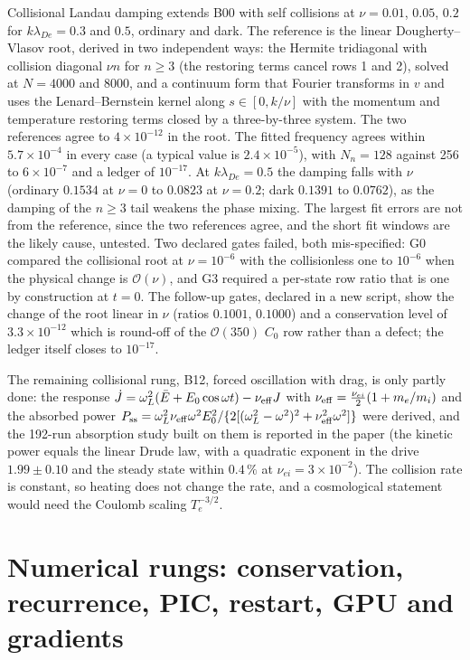 Collisional Landau damping extends B00 with self collisions at $\nu=0.01$, $0.05$, $0.2$ for $k\lambda_{De}=0.3$ and $0.5$, ordinary and dark. The reference is the linear Dougherty--Vlasov root, derived in two independent ways: the Hermite tridiagonal with collision diagonal $\nu n$ for $n\ge3$ (the restoring terms cancel rows 1 and 2), solved at $N=4000$ and 8000, and a continuum form that Fourier transforms in $v$ and uses the Lenard--Bernstein kernel along $s\in[0,k/\nu]$ with the momentum and temperature restoring terms closed by a three-by-three system. The two references agree to $4\times10^{-12}$ in the root. The fitted frequency agrees within $5.7\times10^{-4}$ in every case (a typical value is $2.4\times10^{-5}$), with $N_n=128$ against 256 to $6\times10^{-7}$ and a ledger of $10^{-17}$. At $k\lambda_{De}=0.5$ the damping falls with $\nu$ (ordinary $0.1534$ at $\nu=0$ to $0.0823$ at $\nu=0.2$; dark $0.1391$ to $0.0762$), as the damping of the $n\ge3$ tail weakens the phase mixing. The largest fit errors are not from the reference, since the two references agree, and the short fit windows are the likely cause, untested. Two declared gates failed, both mis-specified: G0 compared the collisional root at $\nu=10^{-6}$ with the collisionless one to $10^{-6}$ when the physical change is $\mathcal O(\nu)$, and G3 required a per-state row ratio that is one by construction at $t=0$. The follow-up gates, declared in a new script, show the change of the root linear in $\nu$ (ratios $0.1001$, $0.1000$) and a conservation level of $3.3\times10^{-12}$ which is round-off of the $\mathcal O(350)$ $C_0$ row rather than a defect; the ledger itself closes to $10^{-17}$.

The remaining collisional rung, B12, forced oscillation with drag, is only partly done: the response $\dot J=\omega_L^2(\bar E+E_0\cos\omega t)-\nu_{\rm eff}J$ with $\nu_{\rm eff}=\tfrac{\nu_{ei}}{2}(1+m_e/m_i)$ and the absorbed power $P_{\rm ss}=\omega_L^2\nu_{\rm eff}\omega^2E_0^2/\{2[(\omega_L^2-\omega^2)^2+\nu_{\rm eff}^2\omega^2]\}$ were derived, and the 192-run absorption study built on them is reported in the paper (the kinetic power equals the linear Drude law, with a quadratic exponent in the drive $1.99\pm0.10$ and the steady state within $0.4\,\%$ at $\nu_{ei}=3\times10^{-2}$). The collision rate is constant, so heating does not change the rate, and a cosmological statement would need the Coulomb scaling $T_e^{-3/2}$.

\section{Numerical rungs: conservation, recurrence, PIC, restart, GPU and gradients}\label{sec:crungs}

